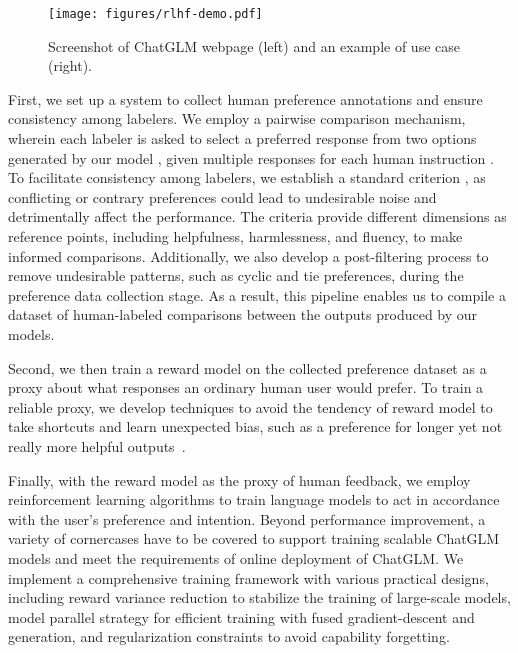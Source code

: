 {\begin{figure}
    \centering
    \texttt{[image: figures/rlhf-demo.pdf]}
    \caption{Screenshot of ChatGLM webpage (left) and an example of use case (right).}
    \label{fig:enter-label}
\end{figure}

First, we set up a system to collect human preference annotations and ensure consistency among labelers. 
We employ a pairwise comparison mechanism, wherein each labeler is asked to select a preferred response from two options generated by our model , given multiple responses for each human instruction .
To facilitate consistency among labelers, we establish a standard criterion , as conflicting or contrary preferences could lead to undesirable noise and detrimentally affect the performance. The criteria provide different dimensions as reference points, including helpfulness, harmlessness, and fluency, to make informed comparisons. 
Additionally, we also develop a post-filtering process to remove undesirable patterns, such as cyclic and tie preferences, during the preference data collection stage. 
As a result, this pipeline enables us to compile a dataset of human-labeled comparisons between the outputs produced by our models.

Second, we then train a reward model on the collected preference dataset as a proxy about what responses an ordinary human user would prefer. To train a reliable proxy, we develop techniques to avoid the tendency of reward model to take shortcuts and learn unexpected bias, such as a preference for longer yet not really more helpful outputs~\cite{singhal2023long,shen2023loose}. 

Finally, with the reward model as the proxy of human feedback, we employ reinforcement learning algorithms to train language models to act in accordance with the user’s preference and intention. 
Beyond performance improvement, a variety of cornercases have to be covered to support training scalable ChatGLM models and meet the requirements of online deployment of ChatGLM. 
We implement a comprehensive training framework with various practical designs, including reward variance reduction to stabilize the training of large-scale models, model parallel strategy for efficient training with fused gradient-descent and generation, and regularization constraints to avoid capability forgetting. 

}
